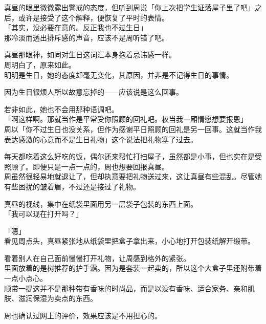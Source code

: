 真昼的眼里微微露出警戒的态度，但听到周说「你上次把学生证落屋子里了吧」之后，或许是接受了这个解释，便恢复了平时的表情。\\

「其实，没必要在意的。反正我也不过生日」\\

那冷淡而透出排斥感的声音，应该不是周听错了吧。

真昼那眼神，如同对生日这词汇本身抱着忌讳感一样。\\

周明白了，原来如此。\\

明明是生日，她的态度却毫无变化，其原因，并非是不记得生日的事情。

因为生日很烦人所以故意忘掉的——应该说是这么回事。

若非如此，她也不会用那种语调吧。\\

「啊这样啊。那就当作是平常受你照顾的回礼吧。权当我一厢情愿想要报恩」\\

周以「你不过生日也没关系，但作为感谢平日照顾的回礼是另一回事。这就当作我表达感激的心意而不是生日礼物」这个说法把礼物塞了过去。

每天都吃着这么好吃的饭，偶尔还来帮忙打扫屋子，虽然都是小事，但也实在是受照顾了。即便只是一点一点的，周也想要回报真昼。\\

周虽然很轻易地就退让了，但却执意要把礼物送过来，这让真昼有些混乱。尽管她有些困扰的皱着眉，不过还是接过了礼物。

真昼的视线，集中在纸袋里面用另一层袋子包装的东西上面。\\

「我可以现在打开吗？」

「嗯」\\

看见周点头，真昼紧张地从纸袋里把盒子拿出来，小心地打开包装纸解开缎带。

看着别人在自己面前慢慢打开礼物，让周感到格外的紧张。\\

里面放着的是树推荐的护手霜。因为是套装一起卖的，所以这个大盒子里还附带着一点小点心。\\

顺带一提这并不是那种带有香味的时尚品，而是以没有香味、适合家务、亲和肌肤、滋润保湿为卖点的东西。

周也确认过网上的评价，效果应该是不用担心的。\\

